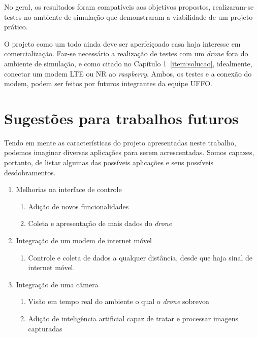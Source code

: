 \documentclass[12pt,a4paper,oneside]{book}
\begin{document}
No geral, os resultados foram compatíveis aos objetivos propostos, realizaram-se testes no ambiente de simulação que demonstraram a viabilidade de um projeto prático.  

O projeto como um todo ainda deve ser aperfeiçoado casa haja interesse em comercialização. Faz-se necessário a realização de testes com um \textit{drone} fora do ambiente de simulação, e como citado no Capítulo 1~\ref{item:solucao}, idealmente, conectar um modem LTE ou NR ao \textit{raspberry}. Ambos, os testes e a conexão do modem, podem ser feitos por futuros integrantes da equipe UFFO.



\chapter{Sugestões para trabalhos futuros}
%
\thispagestyle{empty} 
%
%
Tendo em mente as características do projeto apresentadas neste trabalho, podemos imaginar diversas aplicações para serem acrescentadas. Somos capazes, portanto, de listar algumas das possíveis aplicações e seus possíveis desdobramentos.
%
\begin{enumerate}
    \item Melhorias na interface de controle 
        \begin{enumerate}
            \item Adição de novos funcionalidades
            \item Coleta e apresentação de mais dados do \textit{drone}  
        \end{enumerate}
    \item Integração de um modem de internet móvel
        \begin{enumerate}
            \item Controle e coleta de dados a qualquer distância, desde que haja sinal de internet móvel.
        \end{enumerate}
    \item Integração de uma câmera
        \begin{enumerate}
            \item Visão em tempo real do ambiente o qual o \textit{drone} sobrevoa
            \item Adição de inteligência artificial capaz de tratar e processar imagens capturadas
        \end{enumerate}
\end{enumerate}
\end{document}

